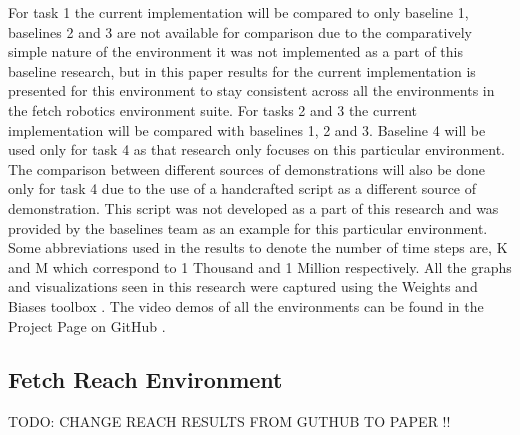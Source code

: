 For task 1 the current implementation will be compared to only baseline 1, baselines 2 and 3 are not available for comparison due to the comparatively simple nature of the environment it was not implemented as a part of this baseline research, but in this paper results for the current implementation is presented for this environment to stay consistent across all the environments in the fetch robotics environment suite. For tasks 2 and 3 the current implementation will be compared with baselines 1, 2 and 3. Baseline 4 will be used only for task 4 as that research only focuses on this particular environment. The comparison between different sources of demonstrations will also be done only for task 4 due to the use of a handcrafted script as a different source of demonstration. This script was not developed as a part of this research and was provided by the baselines team \cite{stable-baselines} as an example for this particular environment. \\

Some abbreviations used in the results to denote the number of time steps are, K and M which correspond to 1 Thousand and 1 Million respectively. All the graphs and visualizations seen in this research were captured using the Weights and Biases toolbox \cite{wandb}. The video demos of all the environments can be found in the Project Page  on GitHub \cite{CurrentImplementation}. \\

\subsection{Fetch Reach Environment}

TODO: CHANGE REACH RESULTS FROM GUTHUB TO PAPER !! \\


